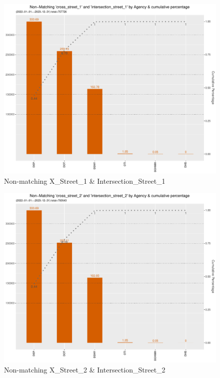 \documentclass[12pt, titlepage]{article}
\begin{document}
{	\begin{figure}[tbp]
		\centering
		\includegraphics[width = \textwidth]{non-matchingcross_street_1andintersection_street_1.pdf}
		\caption{Non-matching X\_Street\_1 \& Intersection\_Street\_1}
		\label{fig:xstreet1}
	\end{figure}	

	\begin{figure}[tbp]
		\centering
		\includegraphics[width = \textwidth]{non-matchingcross_street_2andintersection_street_2.pdf}
		\caption{Non-matching X\_Street\_2 \& Intersection\_Street\_2}
		\label{fig:xstreet2}
	\end{figure}	

}
\end{document}
